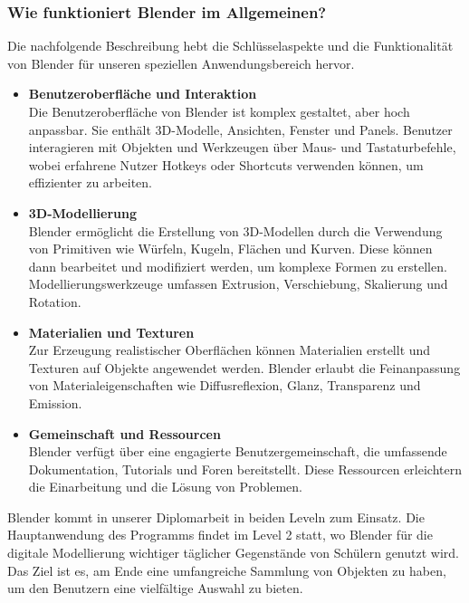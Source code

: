 \subsubsection{Wie funktioniert Blender im Allgemeinen?}

Die nachfolgende Beschreibung hebt die Schlüsselaspekte und die Funktionalität von Blender für unseren speziellen
Anwendungsbereich hervor.

\begin{itemize}
    \item \textbf{Benutzeroberfläche und Interaktion}\\
    Die Benutzeroberfläche von Blender ist komplex gestaltet, aber hoch anpassbar. Sie enthält 3D-Modelle,
    Ansichten, Fenster und Panels. Benutzer interagieren mit Objekten und Werkzeugen über Maus- und Tastaturbefehle,
    wobei erfahrene Nutzer Hotkeys oder Shortcuts verwenden können, um effizienter zu arbeiten.

    \item \textbf{3D-Modellierung}\\
    Blender ermöglicht die Erstellung von 3D-Modellen durch die Verwendung von Primitiven wie Würfeln, Kugeln,
    Flächen und Kurven. Diese können dann bearbeitet und modifiziert werden, um komplexe Formen zu erstellen.
    Modellierungswerkzeuge umfassen Extrusion, Verschiebung, Skalierung und Rotation.

    \item \textbf{Materialien und Texturen}\\
    Zur Erzeugung realistischer Oberflächen können Materialien erstellt und Texturen auf Objekte angewendet werden.
    Blender erlaubt die Feinanpassung von Materialeigenschaften wie Diffusreflexion, Glanz, Transparenz und Emission.

    \item \textbf{Gemeinschaft und Ressourcen}\\
    Blender verfügt über eine engagierte Benutzergemeinschaft, die umfassende Dokumentation, Tutorials und Foren
    bereitstellt. Diese Ressourcen erleichtern die Einarbeitung und die Lösung von Problemen.

\end{itemize}
Blender kommt in unserer Diplomarbeit in beiden Leveln zum Einsatz. Die Hauptanwendung des Programms findet im Level 2
statt, wo Blender für die digitale Modellierung wichtiger täglicher Gegenstände von Schülern genutzt wird. Das Ziel ist
es, am Ende eine umfangreiche Sammlung von Objekten zu haben, um den Benutzern eine vielfältige Auswahl zu bieten.
